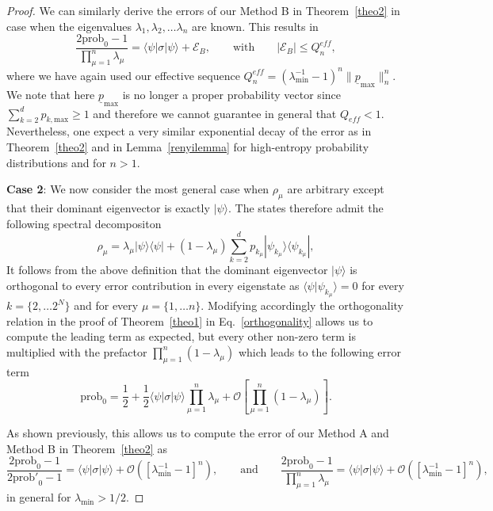 \documentclass[aps,prx,showpacs,twocolumn,reprint]{revtex4-2}
\begin{document}
{\begin{proof}
	We can similarly derive the errors of our Method B in Theorem~\ref{theo2}
	in case when the eigenvalues $\lambda_1, \lambda_2, \dots \lambda_n$ are known.
	This results in 
	\begin{equation*}
	\frac{2\mathrm{prob}_0-1}{ \prod_{\mu=1}^n \lambda_\mu}
	=  \langle \psi  | \sigma | \psi \rangle  + \mathcal{E}_B,
	\quad \quad \text{with}	\quad \quad 
	|\mathcal{E}_B| \leq   Q_n^{eff}   ,
	\end{equation*}
	where we have again used our effective sequence
	$Q_n^{eff} = (\lambda_\mathrm{min}^{-1}{-}1)^n \lVert \underline{p}_\mathrm{max} \rVert_n^n$.
	We note that here $\underline{p}_\mathrm{max}$ is no longer a proper probability vector since
	$\sum_{k=2}^d  p_{k,\mathrm{max}} \geq 1$ and therefore we cannot guarantee
	in general that $Q_{eff}<1$. Nevertheless, one expect a very similar exponential decay
	of the error as in Theorem~\ref{theo2} and in Lemma~\ref{renyilemma} for high-entropy
	probability distributions and for $n>1$.
	
	
	\vspace{1cm}
	\textbf{Case 2}: We now consider the most general case when
	$\rho_\mu$ are arbitrary except that their dominant eigenvector is exactly $ | \psi \rangle$.
	The states therefore admit the following spectral decompositon
	\begin{equation*}
	\rho_\mu =\lambda_\mu | \psi \rangle \langle \psi  |  + (1-\lambda_\mu) \sum_{k=2}^d p_{k_\mu} |\psi_{k_\mu}\rangle \langle \psi_{k_\mu} |,
	\end{equation*}
		It follows from the above definition  that the dominant eigenvector $| \psi \rangle $ is
	orthogonal to every error contribution in every eigenstate as $\langle \psi   |\psi_{k_\mu} \rangle = 0$ for
	every $k=\{ 2, \dots 2^N\}$ and for every $\mu= \{1, \dots n\}$.
	Modifying accordingly the orthogonality relation in the proof of Theorem~\ref{theo1} in Eq.~\eqref{orthogonality} 
	allows us to compute the leading term as expected, but every other non-zero term is multiplied with the
	prefactor $\prod_{\mu=1}^n (1-\lambda_\mu)$ which leads to the following error term
	\begin{equation}
	\mathrm{prob}_0 =\frac{1}{2} + \frac{1}{2}  \langle \psi  | \sigma | \psi \rangle \prod_{\mu=1}^n \lambda_\mu + \mathcal{O}[\prod_{\mu=1}^n (1-\lambda_\mu)].
	\end{equation}
	
	As shown  previously, this allows us to compute the error of our Method A 
	and Method B in Theorem~\ref{theo2} as
	\begin{equation*}
	\frac{2\mathrm{prob}_0-1}{2\mathrm{prob'}_0-1}
	=  \langle \psi  | \sigma | \psi \rangle  +  \mathcal{O}([\lambda_\mathrm{min}^{-1}{-}1]^n),
	\quad \quad \text{and}	\quad \quad 
	\frac{2\mathrm{prob}_0-1}{\prod_{\mu=1}^n \lambda_\mu}
	=  \langle \psi  | \sigma | \psi \rangle  +  \mathcal{O}([\lambda_\mathrm{min}^{-1}{-}1]^n),
	\end{equation*}
	in general for $\lambda_\mathrm{min} > 1/2$.
\end{proof}





}
\end{document}
